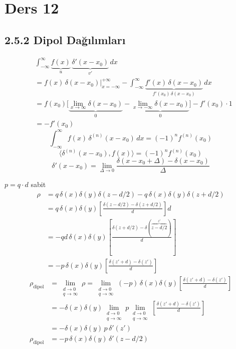 \documentclass[11pt,a4paper]{article}
\begin{document}
\section{Ders 12}
\subsection{2.5.2 Dipol Dağılımları}
\begin{align*}
&\int_{-\infty}^{\infty}\underbrace{f(x)}_{u}\,\underbrace{\delta'(x-x_0)}_{v'}\,dx\\
&=f(x)\,\delta(x-x_0)\Big|_{x=-\infty}^{+\infty}-\int_{-\infty}^{\infty}\underbrace{f'(x)\,\delta(x-x_0)}_{f'(x_0)\,\delta(x-x_0)}\,dx\\
&=f(x_0)\Big[\underbrace{\lim_{x\to\infty}\delta(x-x_0)}_{0}-\underbrace{\lim_{x\to-\infty}\delta(x-x_0)}_{0}\Big]-f'(x_0)\cdot1\\
&=-f'(x_0)
\end{align*}
\[
\int_{-\infty}^{\infty}f(x)\,\delta^{(n)}(x-x_0)\,dx=(-1)^{n}f^{(n)}(x_0)
\]
\[
\langle\delta^{(n)}(x-x_0),f(x)\rangle=(-1)^{n}f^{(n)}(x_0)
\]
\[
\delta'(x-x_0)=\lim_{\Delta\to0}\frac{\delta(x-x_0+\Delta)-\delta(x-x_0)}{\Delta}
\]

\begin{center}
\end{center}

$p=q\cdot d$ sabit
\begin{align*}
\rho&=q\,\delta(x)\delta(y)\delta(z-d/2)-q\,\delta(x)\delta(y)\delta(z+d/2)\\
&=q\,\delta(x)\delta(y)\left[\frac{\delta(z-d/2)-\delta(z+d/2)}{d}\right]d\\
&=-qd\,\delta(x)\delta(y)\left[\frac{\delta(z+d/2)-\delta(\overbrace{z-d/2}^{z'})}{d}\right]\\
&=-p\,\delta(x)\delta(y)\left[\frac{\delta(z'+d)-\delta(z')}{d}\right]
\end{align*}
\begin{align*}
\rho_{\mathrm{dipol}}&=\lim_{\substack{d\to0\\q\to\infty}}\rho=\lim_{\substack{d\to0\\q\to\infty}}(-p)\,\delta(x)\delta(y)\left[\frac{\delta(z'+d)-\delta(z')}{d}\right]\\
&=-\delta(x)\delta(y)\lim_{\substack{d\to0\\q\to\infty}}p\lim_{\substack{d\to0\\q\to\infty}}\left[\frac{\delta(z'+d)-\delta(z')}{d}\right]\\
&=-\delta(x)\delta(y)\,p\,\delta'(z')\\
\rho_{\mathrm{dipol}}&=-p\,\delta(x)\delta(y)\,\delta'(z-d/2)
\end{align*}
\end{document}

